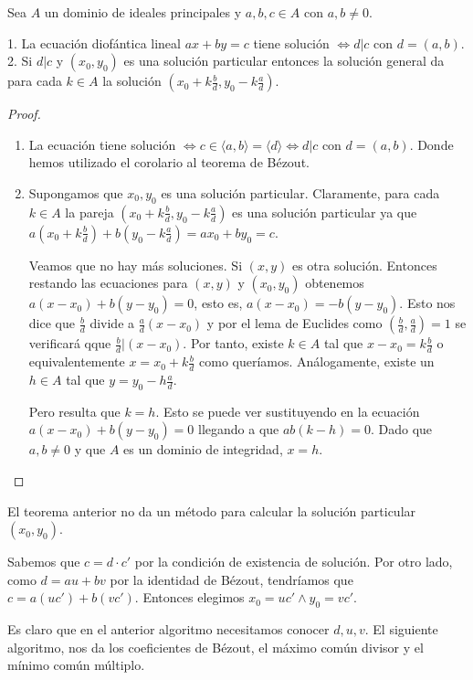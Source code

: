 \begin{theorem}
Sea $A$ un dominio de ideales principales y $a,b,c \in A$ con $a,b \neq 0$. 

1. La ecuación diofántica lineal $ax+by = c$ tiene solución $\iff d|c$ con $d = (a,b)$. \\
2. Si $d|c$ y $(x_0,y_0)$ es una solución particular entonces la solución general da para cada $k \in A$ la solución $(x_0+k\frac{b}{d},y_0-k\frac{a}{d})$. 
\end{theorem}
\begin{proof}
\begin{enumerate}
\item La ecuación tiene solución $\iff c \in \langle a,b \rangle = \langle d \rangle \iff d|c$ con $d = (a,b)$. Donde hemos utilizado el corolario al teorema de Bézout.
\item Supongamos que $x_0,y_0$ es una solución particular. Claramente, para cada $k \in A$ la pareja $(x_0+k\frac{b}{d},y_0-k\frac{a}{d})$ es una solución particular ya que $a(x_0+k\frac{b}{d})+b(y_0-k\frac{a}{d}) = ax_0+by_0 = c$. 

Veamos que no hay más soluciones. Si $(x,y)$ es otra solución. Entonces restando las ecuaciones para $(x,y)$ y $(x_0,y_0)$ obtenemos $a(x-x_0)+b(y-y_0) = 0$, esto es, $a(x-x_0) = -b(y-y_0)$. Esto nos dice que $\frac{b}{d}$ divide a $\frac{a}{d}(x-x_0)$ y por el lema de Euclides como $(\frac{b}{d},\frac{a}{d}) = 1$ se verificará qque $\frac{b}{d}|(x-x_0)$. Por tanto, existe $k \in A$ tal que $x-x_0 = k\frac{b}{d}$ o equivalentemente $x = x_0 + k\frac{b}{d}$ como queríamos. Análogamente, existe un $h \in A$ tal que $y = y_0 - h \frac{a}{d}$. 

Pero resulta que $k = h$. Esto se puede ver sustituyendo en la ecuación $a(x-x_0)+b(y-y_0) = 0$ llegando a que $ab(k-h) = 0$. Dado que $a,b \neq 0$ y que $A$ es un dominio de integridad, $x = h$. 
\end{enumerate}
\end{proof}

El teorema anterior no da un método para calcular la solución particular $(x_0,y_0)$. 

Sabemos que $c = d \cdot c'$ por la condición de existencia de solución. Por otro lado, como $d = au+bv$ por la identidad de Bézout, tendríamos que $c = a(uc')+b(vc')$. Entonces elegimos $x_0 = uc' \land y_0 = vc'$. 

Es claro que en el anterior algoritmo necesitamos conocer $d,u,v$. El siguiente algoritmo, nos da los coeficientes de Bézout, el máximo común divisor y el mínimo común múltiplo. 

